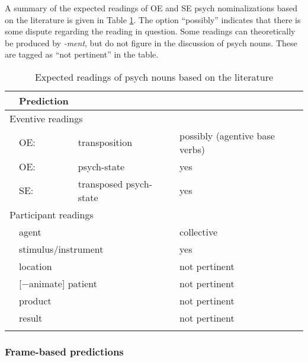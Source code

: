 A summary of the expected readings of OE and SE psych nominalizations based on the literature is given in Table \ref{tab:pred-psy-lit}. The option ``possibly'' indicates that there is some dispute regarding the reading in question.  
Some readings can theoretically be produced by \textit{-ment}, but do not figure in the discussion of psych nouns. These are tagged as ``not pertinent'' in the table. 

\begin{table}
	\caption[Expected readings of psych nouns based on the literature]{Expected readings of psych nouns based on the literature} 
	\label{tab:pred-psy-lit}
	\begin{tabular}{llll}
		\lsptoprule
		\multicolumn{3}{l}{Reading} & Prediction \\
		\midrule
		 \multicolumn{3}{l}{Eventive readings} & \\
		 & OE: & transposition		& 		possibly (agentive base verbs) \\
		 & OE: & psych-state 		&	yes \\
		 & SE: & transposed psych-state 		& yes \\
		\multicolumn{3}{l}{Participant readings} &\\
		& \multicolumn{2}{l}{agent} 				&		collective \\
		& \multicolumn{2}{l}{stimulus/instrument}& yes \\
		& \multicolumn{2}{l}{location} & not pertinent \\
		& \multicolumn{2}{l}{[−animate] patient} & not pertinent\\
		& \multicolumn{2}{l}{product} & not pertinent \\
		& \multicolumn{2}{l}{result} & not pertinent\\
		\lspbottomrule
	\end{tabular}
\end{table} 

\subsubsection{Frame-based predictions}
\label{sec:psy-output-predictions-frames}

